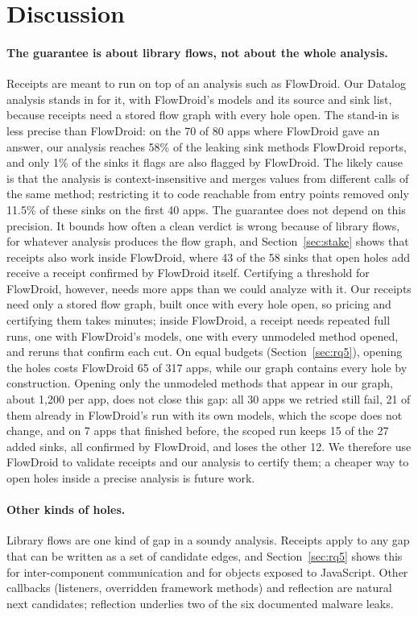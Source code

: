 \section{Discussion}
\label{sec:discussion}

\paragraph{The guarantee is about library flows, not about the whole analysis.}
Receipts are meant to run on top of an analysis such as FlowDroid.
Our Datalog analysis stands in for it, with FlowDroid's models and its source and sink list, because receipts need a stored flow graph with every hole open.
The stand-in is less precise than FlowDroid: on the 70 of 80 apps where FlowDroid gave an answer, our analysis reaches 58\% of the leaking sink methods FlowDroid reports, and only 1\% of the sinks it flags are also flagged by FlowDroid.
The likely cause is that the analysis is context-insensitive and merges values from different calls of the same method; restricting it to code reachable from entry points removed only 11.5\% of these sinks on the first 40 apps.
The guarantee does not depend on this precision.
It bounds how often a clean verdict is wrong because of library flows, for whatever analysis produces the flow graph, and Section~\ref{sec:stake} shows that receipts also work inside FlowDroid, where 43 of the 58 sinks that open holes add receive a receipt confirmed by FlowDroid itself.
Certifying a threshold for FlowDroid, however, needs more apps than we could analyze with it.
Our receipts need only a stored flow graph, built once with every hole open, so pricing and certifying them takes minutes; inside FlowDroid, a receipt needs repeated full runs, one with FlowDroid's models, one with every unmodeled method opened, and reruns that confirm each cut.
On equal budgets (Section~\ref{sec:rq5}), opening the holes costs FlowDroid 65 of 317 apps, while our graph contains every hole by construction.
Opening only the unmodeled methods that appear in our graph, about 1,200 per app, does not close this gap: all 30 apps we retried still fail, 21 of them already in FlowDroid's run with its own models, which the scope does not change, and on 7 apps that finished before, the scoped run keeps 15 of the 27 added sinks, all confirmed by FlowDroid, and loses the other 12.
We therefore use FlowDroid to validate receipts and our analysis to certify them; a cheaper way to open holes inside a precise analysis is future work.

\paragraph{Other kinds of holes.}
Library flows are one kind of gap in a soundy analysis.
Receipts apply to any gap that can be written as a set of candidate edges, and Section~\ref{sec:rq5} shows this for inter-component communication and for objects exposed to JavaScript.
Other callbacks (listeners, overridden framework methods) and reflection are natural next candidates; reflection underlies two of the six documented malware leaks.

